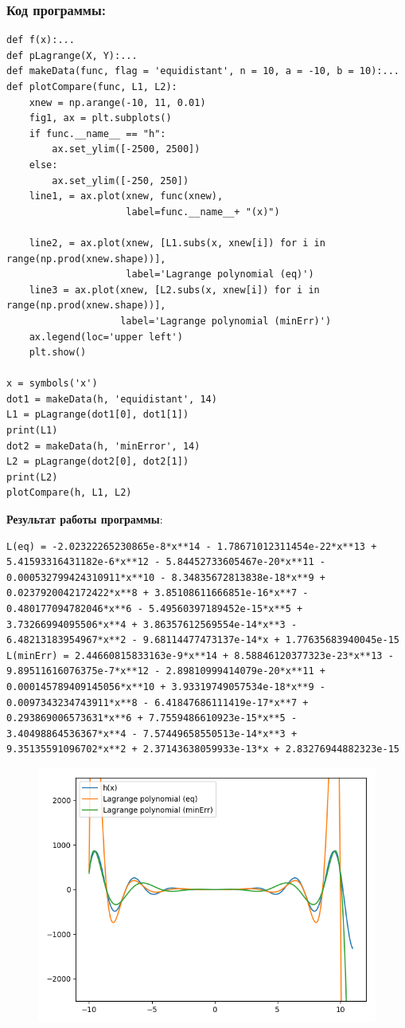 \documentclass[12pt,a4paper]{article}
\begin{document}
\subsubsection{Код программы:}
\begin{verbatim}
def f(x):...
def pLagrange(X, Y):...
def makeData(func, flag = 'equidistant', n = 10, a = -10, b = 10):...
def plotCompare(func, L1, L2):
    xnew = np.arange(-10, 11, 0.01)
    fig1, ax = plt.subplots()
    if func.__name__ == "h":
        ax.set_ylim([-2500, 2500])
    else:
        ax.set_ylim([-250, 250])
    line1, = ax.plot(xnew, func(xnew),
                     label=func.__name__+ "(x)")

    line2, = ax.plot(xnew, [L1.subs(x, xnew[i]) for i in range(np.prod(xnew.shape))],
                     label='Lagrange polynomial (eq)')
    line3 = ax.plot(xnew, [L2.subs(x, xnew[i]) for i in range(np.prod(xnew.shape))],
                    label='Lagrange polynomial (minErr)')
    ax.legend(loc='upper left')
    plt.show()

x = symbols('x')
dot1 = makeData(h, 'equidistant', 14)
L1 = pLagrange(dot1[0], dot1[1])
print(L1)
dot2 = makeData(h, 'minError', 14)
L2 = pLagrange(dot2[0], dot2[1])
print(L2)
plotCompare(h, L1, L2)
\end{verbatim}
\textbf{Результат работы программы}:\\
\begin{verbatim}
L(eq) = -2.02322265230865e-8*x**14 - 1.78671012311454e-22*x**13 + 5.41593316431182e-6*x**12 - 5.84452733605467e-20*x**11 - 0.000532799424310911*x**10 - 8.34835672813838e-18*x**9 + 0.0237920042172422*x**8 + 3.85108611666851e-16*x**7 - 0.480177094782046*x**6 - 5.49560397189452e-15*x**5 + 3.73266994095506*x**4 + 3.86357612569554e-14*x**3 - 6.48213183954967*x**2 - 9.68114477473137e-14*x + 1.77635683940045e-15 
L(minErr) = 2.44660815833163e-9*x**14 + 8.58846120377323e-23*x**13 - 9.89511616076375e-7*x**12 - 2.89810999414079e-20*x**11 + 0.000145789409145056*x**10 + 3.93319749057534e-18*x**9 - 0.0097343234743911*x**8 - 6.41847686111419e-17*x**7 + 0.293869006573631*x**6 + 7.7559486610923e-15*x**5 - 3.40498864536367*x**4 - 7.57449658550513e-14*x**3 + 9.35135591096702*x**2 + 2.37143638059933e-13*x + 2.83276944882323e-15
\end{verbatim}
\begin{figure}[h]
\includegraphics[width=\linewidth]{L(h).png}
\caption{}
\label{fig:}
\end{figure}\\
\end{document}
